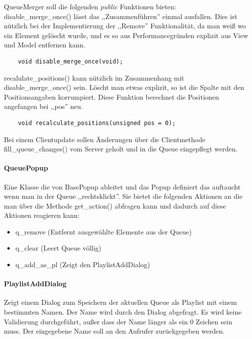 QueueMerger soll die folgenden \textit{public} Funktionen bieten:
\\
disable\_merge\_once() lässt das ,,Zusammenführen'' einmal ausfallen. Dies ist nützlich bei der Implementierung der ,,Remove'' Funktionalität,
da man weiß wo ein Element gelöscht wurde, und es so aus Performancegründen explizit aus View und Model entfernen kann.
\begin{verbatim}  
    void disable_merge_once(void);
\end{verbatim}
recalulate\_positions() kann nützlich im Zusammenhang mit disable\_merge\_once() sein. Löscht man etwas explizit, so ist die Spalte mit den Positionsangaben korrumpiert. Diese Funktion berechnet die Positionen angefangen bei ,,pos'' neu.
\begin{verbatim}        
    void recalculate_positions(unsigned pos = 0);
\end{verbatim}    

Bei einem Clientupdate sollen Änderungen über die Clientmethode fill\_queue\_changes() vom Server geholt und in die Queue eingepflegt werden. 


\paragraph{QueuePopup}
Eine Klasse die von BasePopup ableitet und das Popup definiert das auftaucht wenn man in der Queue ,,rechtsklickt''.
Sie bietet die folgenden Aktionen an die man über die Methode get\_action() abfragen kann und dadurch auf diese Aktionen reagieren kann:
\begin{itemize}
\item q\_remove (Entfernt ausgewählte Elemente aus der Queue)
\item q\_clear (Leert Queue völlig)
\item q\_add\_as\_pl (Zeigt den PlaylistAddDialog)
\end{itemize}

\paragraph{PlaylistAddDialog}
Zeigt einem Dialog zum Speichern der aktuellen Queue als Playlist mit einem bestimmten Namen. Der Name wird durch den Dialog abgefragt.
Es wird keine Validierung durchgeführt, außer dass der Name länger als ein 0 Zeichen sein muss. Der eingegebene Name soll an den Aufrufer zurückgegeben werden.

